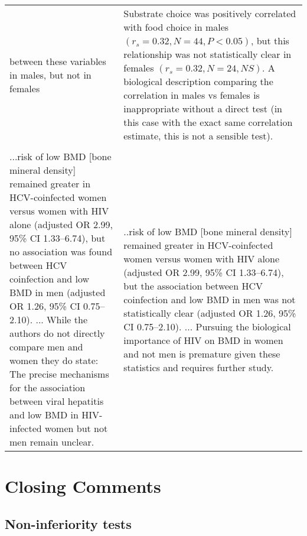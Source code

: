 \begin{tabular}{p{7.5cm}p{7.5cm}}
        between these variables in males, but not in females & 
        Substrate choice was positively correlated with food choice in males $(r_{s} = 0.32, N = 44, P < 0.05)$, but this
        relationship was not statistically clear in females $(r_{s} = 0.32, N = 24, NS)$. A biological description comparing 
        the correlation in males vs females is inappropriate without a direct test (in this case with the exact same 
        correlation estimate, this is not a sensible test).
\\
        \\
        ...risk of low BMD [bone mineral density] remained greater in HCV-coinfected women versus women with HIV alone
        (adjusted OR 2.99, 95\% CI 1.33–6.74), but no association was found between HCV coinfection and low BMD in men 
        (adjusted OR 1.26, 95\% CI 0.75–2.10). ... While the authors do not directly compare men and women they do state: 
        The precise mechanisms for the association between viral hepatitis and low BMD in HIV-infected women but not men 
        remain unclear.
& 
        ..risk of low BMD [bone mineral density] remained greater in HCV-coinfected women versus women with HIV alone
        (adjusted OR 2.99, 95\% CI 1.33–6.74), but the association between HCV coinfection and low BMD in men was not
        statistically clear (adjusted OR 1.26, 95\% CI 0.75–2.10). ... Pursuing the biological importance of HIV on BMD in 
        women and not men is premature given these statistics and requires further study.
        \\
\end{tabular}

\section*{Closing Comments}

\subsection*{Non-inferiority tests}

